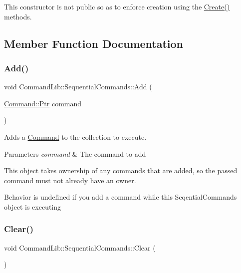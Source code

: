 This constructor is not public so as to enforce creation using the \mbox{\hyperlink{class_command_lib_1_1_sequential_commands_aaacdef25d7dba29bae8ff7763c55017e}{Create()}} methods. 



\subsection{Member Function Documentation}
\mbox{\label{class_command_lib_1_1_sequential_commands_af0100e15f7897471ce84802ab6c25e00}} 
\subsubsection{\texorpdfstring{Add()}{Add()}}
{\footnotesize\ttfamily void Command\+Lib\+::\+Sequential\+Commands\+::\+Add (\begin{DoxyParamCaption}\item[{\mbox{\hyperlink{class_command_lib_1_1_command_a3b3e4f00144373299df5c6bb1acc319d}{Command\+::\+Ptr}}}]{command }\end{DoxyParamCaption})}



Adds a \mbox{\hyperlink{class_command_lib_1_1_command}{Command}} to the collection to execute.


\begin{DoxyParams}{Parameters}
{\em command} & The command to add\\
\hline
\end{DoxyParams}


This object takes ownership of any commands that are added, so the passed command must not already have an owner. 

Behavior is undefined if you add a command while this Seqential\+Commands object is executing\mbox{\label{class_command_lib_1_1_sequential_commands_ad022ea238a8c3ac1c1f71a5b71f6d94f}} 
\subsubsection{\texorpdfstring{Clear()}{Clear()}}
{\footnotesize\ttfamily void Command\+Lib\+::\+Sequential\+Commands\+::\+Clear (\begin{DoxyParamCaption}{ }\end{DoxyParamCaption})}



